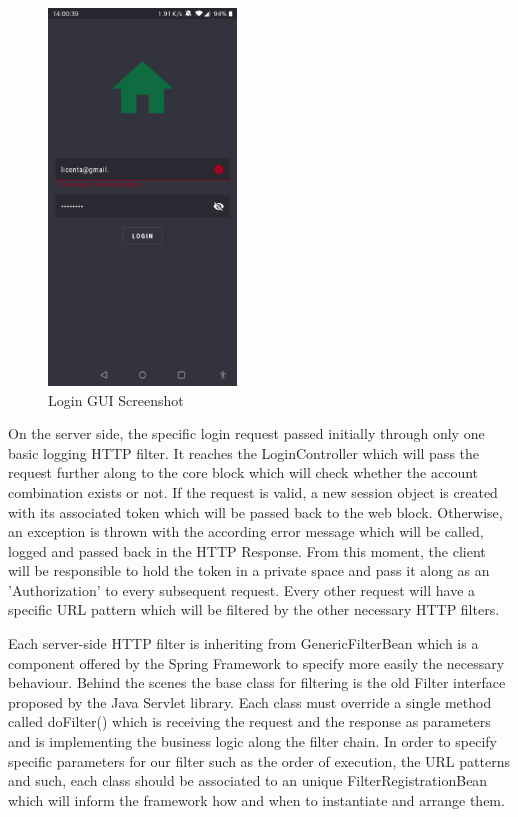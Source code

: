 \begin{figure}[H]
\centering
\includegraphics[height=10cm]{images/LoginGUIScreenshot.jpg} 
\caption{Login GUI Screenshot}
\label{fig:loginguiscreenshot}
\end{figure}

On the server side, the specific login request passed initially through only one basic logging HTTP filter. It reaches the LoginController which will pass the request further along to the core block which will check whether the account combination exists or not. If the request is valid, a new session object is created with its associated token which will be passed back to the web block. Otherwise, an exception is thrown with the according error message which will be called, logged and passed back in the HTTP Response. From this moment, the client will be responsible to hold the token in a private space and pass it along as an 'Authorization' to every subsequent request. Every other request will have a specific URL pattern which will be filtered by the other necessary HTTP filters.

Each server-side HTTP filter is inheriting from GenericFilterBean which is a component offered by the Spring Framework to specify more easily the necessary behaviour. Behind the scenes the base class for filtering is the old Filter interface proposed by the Java Servlet library. Each class must override a single method called doFilter() which is receiving the request and the response as parameters and is implementing the business logic along the filter chain. In order to specify specific parameters for our filter such as the order of execution, the URL patterns and such, each class should be associated to an unique FilterRegistrationBean which will inform the framework how and when to instantiate and arrange them.

